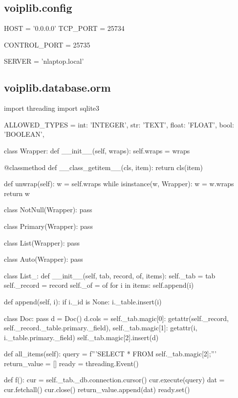 \subsection{voiplib.config}
\begin{pythoncode}
HOST = '0.0.0.0'
TCP_PORT = 25734

CONTROL_PORT = 25735

SERVER = 'nlaptop.local'
\end{pythoncode}
\subsection{voiplib.database.orm}
\begin{pythoncode}
import threading
import sqlite3


ALLOWED_TYPES = {
    int: 'INTEGER',
    str: 'TEXT',
    float: 'FLOAT',
    bool: 'BOOLEAN',
}


class Wrapper:
    def __init__(self, wraps):
        self.wraps = wraps

    @classmethod
    def __class_getitem__(cls, item):
        return cls(item)
    
    def unwrap(self):
        w = self.wraps
        while isinstance(w, Wrapper):
            w = w.wraps
        return w


class NotNull(Wrapper):
    pass


class Primary(Wrapper):
    pass


class List(Wrapper):
    pass


class Auto(Wrapper):
    pass


class List_:
    def __init__(self, tab, record, of, items):
        self._tab = tab
        self._record = record
        self._of = of
        for i in items:
            self.append(i)
    
    def append(self, i):
        if i._id is None:
            i._table.insert(i)
        
        class Doc:
            pass
        d = Doc()
        d.cols = {
            self._tab.magic[0]: getattr(self._record, self._record._table.primary._field),
            self._tab.magic[1]: getattr(i, i._table.primary._field)
        }
        self._tab.magic[2].insert(d)
    
    def all_items(self):
        query = f'''SELECT * FROM {self._tab.magic[2]};'''
        return_value = []
        ready = threading.Event()

        def f():
            cur = self._tab._db.connection.cursor()
            cur.execute(query)
            dat = cur.fetchall()
            cur.close()
            return_value.append(dat)
            ready.set()
        

\end{pythoncode}

